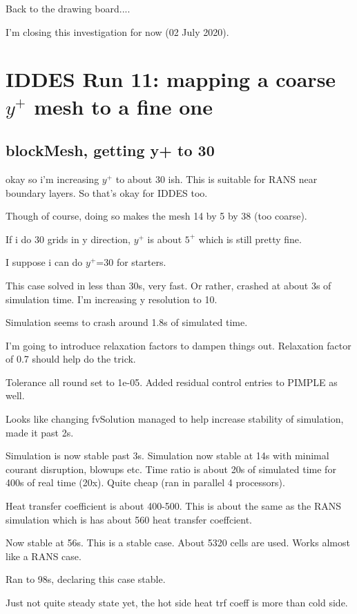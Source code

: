 \documentclass[12pt]{article}
\renewcommand{\_}{\kern-1.5pt\textunderscore\kern-1.5pt}
\begin{document}
Back to the drawing board....


I'm closing this investigation for now (02 July 2020).

\section{IDDES Run 11: mapping a coarse $y^+$ mesh to a fine one}

\subsection{blockMesh, getting y+ to 30}

okay so i'm increasing $y^+$ to about 30 ish. This is suitable for RANS near boundary layers. So that's okay for IDDES too. 

Though of course, doing so makes the mesh 14 by 5 by 38 (too coarse).

If i do 30 grids in y direction, $y^+$ is about $5^+$ which is still pretty fine.

I suppose i can do $y^+$=30 for starters.

This case solved in less than 30s, very fast. Or rather, crashed at about 3s of simulation time.
I'm increasing y resolution to 10. 

Simulation seems to crash around 1.8s of simulated time. 

I'm going to introduce relaxation factors to dampen things out. 
Relaxation factor of 0.7 should help do the trick.

Tolerance all round set to 1e-05. Added residual control entries to PIMPLE as well.

Looks like changing fvSolution managed to help increase stability of simulation, made it past 2s.

Simulation is now stable past 3s.
Simulation now stable at 14s with minimal courant disruption, blowups etc.
Time ratio is about 20s of simulated time for 400s of real time (20x). Quite cheap (ran in parallel 4 processors). 

Heat transfer coefficient is about 400-500. 
This is about the same as the RANS simulation which is has about 560 heat transfer coeffcient.

Now stable at 56s. This is a stable case.
About 5320 cells are used. Works almost like a RANS case. 

Ran to 98s, declaring this case stable.

Just not quite steady state yet, the hot side heat trf coeff is more than cold side. 
\end{document}
